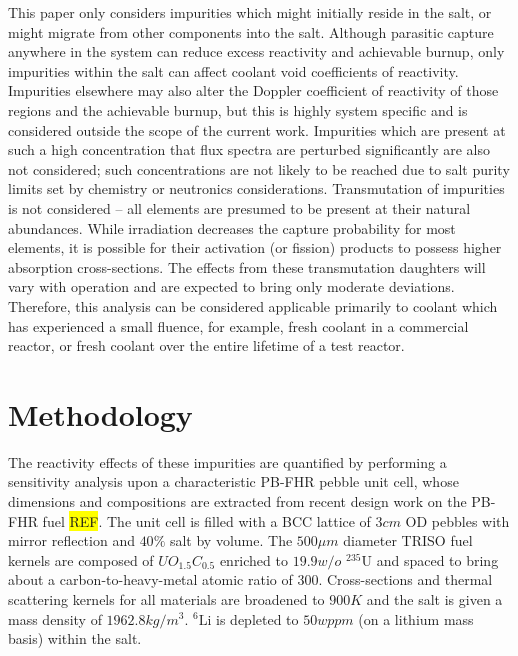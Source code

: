 \documentclass[11pt]{article}
\newcommand{\iso}[2]{$^{#2}\mathrm{#1}$}
\newcommand{\REF}[0]{\colorbox{yellow}{REF}}
\begin{document}
This paper only considers impurities which might initially reside in the salt, or might migrate from other components into the salt.
Although parasitic capture anywhere in the system can reduce excess reactivity and achievable burnup, only impurities within the salt can affect coolant void coefficients of reactivity.
Impurities elsewhere may also alter the Doppler coefficient of reactivity of those regions and the achievable burnup, but this is highly system specific and is considered outside the scope of the current work.
Impurities which are present at such a high concentration that flux spectra are perturbed significantly are also not considered; such concentrations are not likely to be reached due to salt purity limits set by chemistry or neutronics considerations.
Transmutation of impurities is not considered -- all elements are presumed to be present at their natural abundances.
While irradiation decreases the capture probability for most elements, it is possible for their activation (or fission) products to possess higher absorption cross-sections.
The effects from these transmutation daughters will vary with operation and are expected to bring only moderate deviations.
Therefore, this analysis can be considered applicable primarily to coolant which has experienced a small fluence, for example, fresh coolant in a commercial reactor, or fresh coolant over the entire lifetime of a test reactor.

\section{Methodology}
\label{sec:methodology}

The reactivity effects of these impurities are quantified by performing a sensitivity analysis upon a characteristic PB-FHR pebble unit cell, whose dimensions and compositions are extracted from recent design work on the PB-FHR fuel \REF.
The unit cell is filled with a BCC lattice of $3cm$ OD pebbles with mirror reflection and $40\%$ salt by volume.
The $500\mu m$ diameter TRISO fuel kernels are composed of $UO_{1.5} C_{0.5}$ enriched to $19.9w/o$ \iso{U}{235} and spaced to bring about a carbon-to-heavy-metal atomic ratio of $300$.
Cross-sections and thermal scattering kernels for all materials are broadened to $900K$ and the salt is given a mass density of $1962.8 kg/m^3$.
\iso{Li}{6} is depleted to $50wppm$ (on a lithium mass basis) within the salt.
\end{document}
